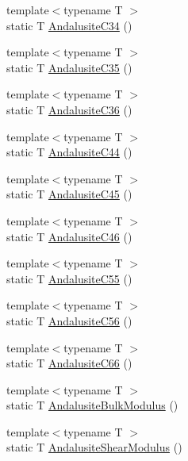 \begin{DoxyCompactItemize}
\item 
{\footnotesize template$<$typename T $>$ }\\static T \mbox{\hyperlink{namespacempc_1_1data_a0181878142d5e3fac6daa73cd1a5a861}{Andalusite\+C34}} ()
\item 
{\footnotesize template$<$typename T $>$ }\\static T \mbox{\hyperlink{namespacempc_1_1data_aa350303d961c189691a5e212fa07b205}{Andalusite\+C35}} ()
\item 
{\footnotesize template$<$typename T $>$ }\\static T \mbox{\hyperlink{namespacempc_1_1data_a43a831f6cac70142d831679a858ce72b}{Andalusite\+C36}} ()
\item 
{\footnotesize template$<$typename T $>$ }\\static T \mbox{\hyperlink{namespacempc_1_1data_ad87279e33aa97a20c810a4c969ac5b59}{Andalusite\+C44}} ()
\item 
{\footnotesize template$<$typename T $>$ }\\static T \mbox{\hyperlink{namespacempc_1_1data_a3f4016cd70c9db19c852f6ed94dc6574}{Andalusite\+C45}} ()
\item 
{\footnotesize template$<$typename T $>$ }\\static T \mbox{\hyperlink{namespacempc_1_1data_a4e47f7a853bc1b31ae29c43c712a9a9f}{Andalusite\+C46}} ()
\item 
{\footnotesize template$<$typename T $>$ }\\static T \mbox{\hyperlink{namespacempc_1_1data_a68fbbac6775da77122774a27db2b44fe}{Andalusite\+C55}} ()
\item 
{\footnotesize template$<$typename T $>$ }\\static T \mbox{\hyperlink{namespacempc_1_1data_ac9ee242c4ed6f414f2c6f632fcb662b2}{Andalusite\+C56}} ()
\item 
{\footnotesize template$<$typename T $>$ }\\static T \mbox{\hyperlink{namespacempc_1_1data_a15f0814bc43a27d1a0577de251ae7ba8}{Andalusite\+C66}} ()
\item 
{\footnotesize template$<$typename T $>$ }\\static T \mbox{\hyperlink{namespacempc_1_1data_a2589c555f8924d6e80089c067471c110}{Andalusite\+Bulk\+Modulus}} ()
\item 
{\footnotesize template$<$typename T $>$ }\\static T \mbox{\hyperlink{namespacempc_1_1data_a2fe751987d0a4bd2bdeafd831fb3315d}{Andalusite\+Shear\+Modulus}} ()
\item 

\end{DoxyCompactItemize}

